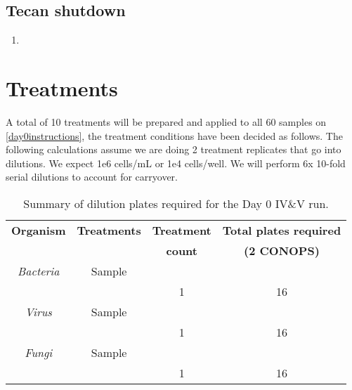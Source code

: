 \documentclass{article}
\begin{document}
\subsection{Tecan shutdown}
\label{sec:tecan-shut}
\begin{enumerate}
\item 
\end{enumerate}

\section{Treatments} \label{treatments}
A total of 10 treatments will be prepared and applied to all 60 samples on  \ref{day0instructions}, the treatment conditions have been decided as follows. The following calculations assume we are doing 2 treatment replicates that go into dilutions. We expect 1e6 cells/mL or 1e4 cells/well. We will perform 6x 10-fold serial dilutions to account for carryover.

\begin{table}
  \centering
  \begin{tabular}[]{c|c|c|c}
    \textbf{Organism} & \textbf{Treatments} & \textbf{Treatment} & \textbf{Total plates required} \\
     &  & \textbf{count} & \textbf{(2 CONOPS)} \\
    \hline
    \textit{Bacteria} & Sample  & & \\
    \hline
    & & 1 & 16\\
    \hline
    \textit{Virus} & Sample  & & \\
    \hline
    & & 1 & 16\\
    \hline
    \textit{Fungi} & Sample  & & \\
    \hline
    & & 1 & 16\\
    \hline

  \end{tabular}
  \caption{Summary of dilution plates required for the Day 0 IV\&V run.}
  \label{tab:dilution-plan-day-0}
\end{table}
\end{document}

